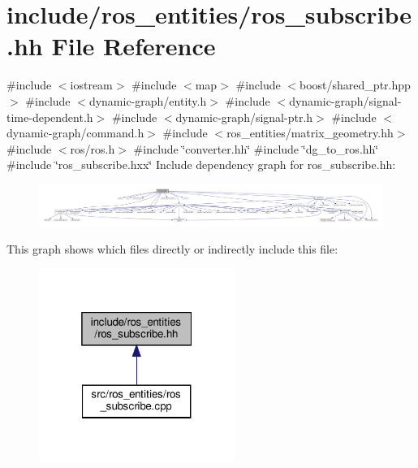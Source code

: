 \hypertarget{ros__subscribe_8hh}{}\section{include/ros\+\_\+entities/ros\+\_\+subscribe.hh File Reference}
\label{ros__subscribe_8hh}
{\ttfamily \#include $<$iostream$>$}\newline
{\ttfamily \#include $<$map$>$}\newline
{\ttfamily \#include $<$boost/shared\+\_\+ptr.\+hpp$>$}\newline
{\ttfamily \#include $<$dynamic-\/graph/entity.\+h$>$}\newline
{\ttfamily \#include $<$dynamic-\/graph/signal-\/time-\/dependent.\+h$>$}\newline
{\ttfamily \#include $<$dynamic-\/graph/signal-\/ptr.\+h$>$}\newline
{\ttfamily \#include $<$dynamic-\/graph/command.\+h$>$}\newline
{\ttfamily \#include $<$ros\+\_\+entities/matrix\+\_\+geometry.\+hh$>$}\newline
{\ttfamily \#include $<$ros/ros.\+h$>$}\newline
{\ttfamily \#include \char`\"{}converter.\+hh\char`\"{}}\newline
{\ttfamily \#include \char`\"{}dg\+\_\+to\+\_\+ros.\+hh\char`\"{}}\newline
{\ttfamily \#include \char`\"{}ros\+\_\+subscribe.\+hxx\char`\"{}}\newline
Include dependency graph for ros\+\_\+subscribe.\+hh\+:
\nopagebreak
\begin{figure}[H]
\begin{center}
\leavevmode
\includegraphics[width=350pt]{ros__subscribe_8hh__incl}
\end{center}
\end{figure}
This graph shows which files directly or indirectly include this file\+:
\nopagebreak
\begin{figure}[H]
\begin{center}
\leavevmode
\includegraphics[width=181pt]{ros__subscribe_8hh__dep__incl}
\end{center}
\end{figure}
